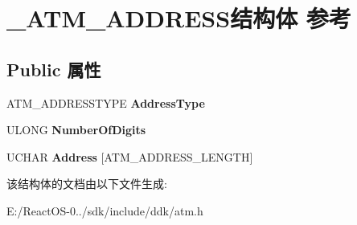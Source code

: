 \hypertarget{struct___a_t_m___a_d_d_r_e_s_s}{}\section{\+\_\+\+A\+T\+M\+\_\+\+A\+D\+D\+R\+E\+S\+S结构体 参考}
\label{struct___a_t_m___a_d_d_r_e_s_s}
\subsection*{Public 属性}
\begin{DoxyCompactItemize}
\item 
\mbox{\label{struct___a_t_m___a_d_d_r_e_s_s_a340d4663c5b236ef023d9460c52448f5}} 
A\+T\+M\+\_\+\+A\+D\+D\+R\+E\+S\+S\+T\+Y\+PE {\bfseries Address\+Type}
\item 
\mbox{\label{struct___a_t_m___a_d_d_r_e_s_s_ad88d2f033c2fe0a36edea93969346e8b}} 
U\+L\+O\+NG {\bfseries Number\+Of\+Digits}
\item 
\mbox{\label{struct___a_t_m___a_d_d_r_e_s_s_a0c006bef19027d3785fdc0ae30df3651}} 
U\+C\+H\+AR {\bfseries Address} \mbox{[}A\+T\+M\+\_\+\+A\+D\+D\+R\+E\+S\+S\+\_\+\+L\+E\+N\+G\+TH\mbox{]}
\end{DoxyCompactItemize}


该结构体的文档由以下文件生成\+:\begin{DoxyCompactItemize}
\item 
E\+:/\+React\+O\+S-\/0../sdk/include/ddk/atm.\+h\end{DoxyCompactItemize}
